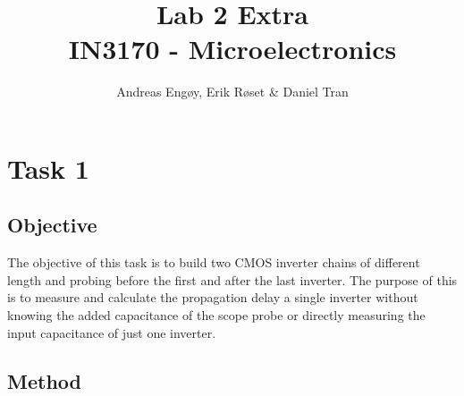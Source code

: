 \documentclass[onecolumn]{article}
\title{Lab 2 Extra \\ \Large{IN3170 - Microelectronics}}
\author{Andreas Engøy, Erik Røset \& Daniel Tran}
\date{\monthname[\the\month] \the\year}
\begin{document}
\maketitle
\tableofcontents

\section{Task 1}

\subsection{Objective}
The objective of this task is to build two CMOS inverter chains of different length and probing before the first and after the last inverter. The purpose of this is to measure and calculate the propagation delay a single inverter without knowing the added capacitance of the scope probe or directly measuring the input capacitance of just one inverter.

\subsection{Method}
\end{document}
